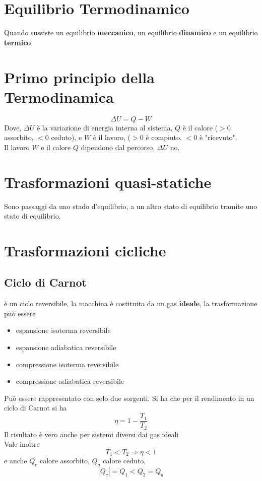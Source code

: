 \documentclass[a4paper]{report}
\begin{document}
  \section{Equilibrio Termodinamico}
  Quando sussiste un equilibrio \textbf{meccanico}, un equilibrio \textbf{dinamico} e un equilibrio \textbf{termico}

  \section{Primo principio della Termodinamica}
  \[ \Delta U = Q - W \]
  Dove, $\Delta U$ è la variazione di energia interna al sistema, $Q$ è il calore ($>0$ assorbito, $<0$ ceduto), e $W$ è il lavoro, ($>0$ è compiuto, $<0$ è "ricevuto".\\
  Il lavoro $W$ e il calore $Q$ dipendono dal percorso, $\Delta U$ no.

  \section{Trasformazioni quasi-statiche}
  Sono passaggi da uno stado d'equilibrio, a un altro stato di equilibrio tramite uno stato di equilibrio.

  \section{Trasformazioni cicliche}
  \subsection{Ciclo di Carnot}
  è un ciclo reversibile, la macchina è costituita da un gas \textbf{ideale}, la trasformazione può essere
  \begin{itemize}
    \item espansione isoterma reversibile
    \item espansione adiabatica reversibile
    \item compressione isoterma reversibile
    \item compressione adiabatica reversibile
  \end{itemize}
  Può essere rappresentato con solo due sorgenti. Si ha che per il rendimento in un ciclo di Carnot si ha
  \[ \eta = 1 - \frac{T_1}{T_2}\]
  Il risultato è vero anche per sistemi diversi dai gas ideali \\
  Vale inoltre
  \[ T_1 < T_2 \Rightarrow \eta < 1 \]
  e anche $Q_c$ calore assorbito, $Q_a$ calore ceduto,
  \[ |Q_c| = Q_1 < Q_2 = Q_a \]
\end{document}
